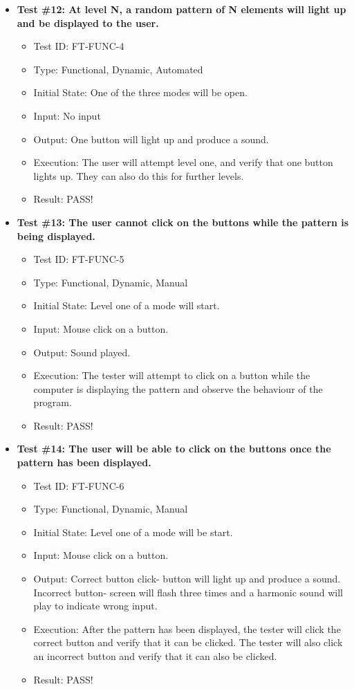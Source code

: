 \documentclass[12pt, titlepage]{article}
\begin{document}
\begin{itemize}
\item \textbf{Test \#12: At level N, a random pattern of N elements will light up and be displayed to the user. }
\begin{itemize}
\item Test ID: FT-FUNC-4
\item Type: Functional, Dynamic, Automated		
\item Initial State: One of the three modes will be open. 					
\item Input: No input				
\item Output: One button will light up and produce a sound.		
\item Execution: The user will attempt level one, and verify that one button lights up. They can also do this for further levels. 
\item Result: PASS!
\end{itemize}

\item \textbf{Test \#13: The user cannot click on the buttons while the pattern is being displayed.}
\begin{itemize}
\item Test ID: FT-FUNC-5
\item Type: Functional, Dynamic, Manual	
\item Initial State: Level one of a mode will start.					
\item Input: Mouse click on a button. 					
\item Output: Sound played. 					
\item Execution: The tester will attempt to click on a button while the computer is displaying the pattern and observe the behaviour of the program.
\item Result: PASS!
\end{itemize}

\item \textbf{Test \#14: The user will be able to click on the buttons once the pattern has been displayed.}
\begin{itemize}
\item Test ID: FT-FUNC-6
\item Type: Functional, Dynamic, Manual	
\item Initial State: Level one of a mode will be start.					
\item Input: Mouse click on a button.					
\item Output: Correct button click- button will light up and produce a sound. Incorrect button- screen will flash three times and a harmonic sound will play to indicate wrong input. 					
\item Execution: After the pattern has been displayed, the tester will click the correct button and verify that it can be clicked. The tester will also click an incorrect button and verify that it can also be clicked.
\item Result: PASS!
\end{itemize}


\end{itemize}
\end{document}
